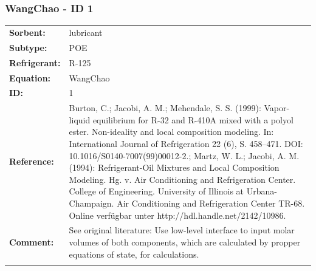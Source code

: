 \subsubsection{WangChao - ID 1}
%
\begin{tabular}[l]{|lp{11.5cm}|}
\hline
\addlinespace

\textbf{Sorbent:} & lubricant \\
\textbf{Subtype:} & POE \\
\textbf{Refrigerant:} & R-125 \\
\textbf{Equation:} & WangChao \\
\textbf{ID:} & 1 \\
\textbf{Reference:} & Burton, C.; Jacobi, A. M.; Mehendale, S. S. (1999): Vapor-liquid equilibrium for R-32 and R-410A mixed with a polyol ester. Non-ideality and local composition modeling. In: International Journal of Refrigeration 22 (6), S. 458–471. DOI: 10.1016/S0140-7007(99)00012-2.; Martz, W. L.; Jacobi, A. M. (1994): Refrigerant-Oil Mixtures and Local Composition Modeling. Hg. v. Air Conditioning and Refrigeration Center. College of Engineering. University of Illinois at Urbana-Champaign. Air Conditioning and Refrigeration Center TR-68. Online verfügbar unter http://hdl.handle.net/2142/10986. \\
\textbf{Comment:} & See original literature: Use low-level interface to input molar volumes of both components, which are calculated by propper equations of state, for calculations. \\

\addlinespace
\hline
\end{tabular}
\newline


